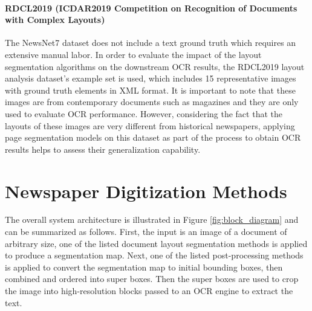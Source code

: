 \documentclass[letterpaper]{article} %
\begin{document}
\paragraph{RDCL2019 (ICDAR2019 Competition on Recognition of Documents with Complex Layouts)}
The NewsNet7 dataset does not include a text ground truth which requires an extensive manual labor. In order to evaluate the impact of the layout segmentation algorithms on the downstream OCR results, the RDCL2019 layout analysis dataset's \cite{DBLP:conf/icdar/ClausnerAP19} example set is used, which includes 15 representative images with ground truth elements in XML format. It is important to note that these images are from contemporary documents such as magazines and they are only used to evaluate OCR performance. However, considering the fact that the layouts of these images are very different from historical newspapers, applying page segmentation models on this dataset as part of the process to obtain OCR results helps to assess their generalization capability.
 

 

\section{Newspaper Digitization Methods}
The overall system architecture is illustrated in Figure \ref{fig:block_diagram} and can be summarized as follows. First, the input is an image of a document of arbitrary size, one of the listed document layout segmentation methods is applied to produce a segmentation map. Next, one of the listed post-processing methods is applied to convert the segmentation map to initial bounding boxes, then combined and ordered into super boxes. Then the super boxes are used to crop the image into high-resolution blocks passed to an OCR engine to extract the text.

\end{document}
